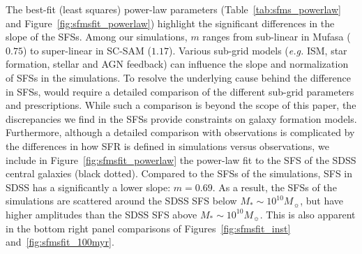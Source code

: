 \documentclass[tighten, preprint]{aastex62}
\begin{document}
The best-fit (least squares) power-law parameters (Table~\ref{tab:sfms_powerlaw} 
and Figure~\ref{fig:sfmsfit_powerlaw}) highlight the significant %
differences in the slope of the SFSs. Among our simulations, $m$ ranges 
from sub-linear in {\sc Mufasa} ($0.75$) to super-linear in SC-SAM ($1.17$).  
Various sub-grid models (\emph{e.g.} ISM, star  formation, stellar and 
AGN feedback) can influence the slope and normalization of SFSs in the 
simulations. To resolve the underlying cause behind the difference in SFSs, 
would require a detailed comparison of the different sub-grid parameters 
and prescriptions. While such a comparison is beyond the scope of this 
paper, the discrepancies we find in the SFSs provide constraints on 
galaxy formation models. Furthermore,
although a detailed comparison with observations is complicated by the 
differences in how SFR is defined in simulations versus observations, 
we include in Figure~\ref{fig:sfmsfit_powerlaw} the power-law fit to the 
SFS of the SDSS central galaxies (black dotted). Compared to the SFSs of the 
simulations, SFS in SDSS has a significantly a lower slope: $m=0.69$. As a 
result, the SFSs of the simulations are scattered around the SDSS SFS 
below $M_*{\sim}10^{10} M_\sun$, but have higher amplitudes than the SDSS SFS 
above $M_*{\sim}10^{10} M_\sun$. This is also apparent in the bottom right 
panel comparisons of Figures~\ref{fig:sfmsfit_inst} and~\ref{fig:sfmsfit_100myr}. 

\end{document}

